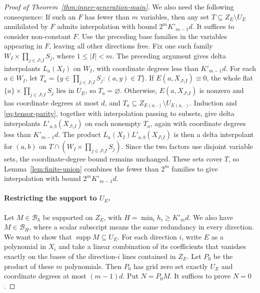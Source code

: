 \documentclass[11pt,letterpaper]{article}
\renewcommand{\le}{\leqslant}
\renewcommand{\ge}{\geqslant}
\theoremstyle{definition}
\theoremstyle{remark}
\newcommand{\supp}{\operatorname{supp}}
\begin{document}
\begin{proof}[Proof of Theorem~\ref{thm:inner-generation-main}]
We also need the following consequence: If such an $F$ has fewer than
$m$ variables, then any set
$T\subseteq Z_E\setminus U_E$ annihilated by $F$ admits interpolation
with bound $2^mK'_{m-1}d$.
It suffices to consider non-constant $F$. Use the
preceding base families in the variables appearing in $F$,
leaving all other directions free. Fix one such family
$W_I\times \prod_{j\in J \setminus I} S_j$, where $1\le|I|<m$. The preceding argument gives delta
interpolants $L_a(X_I)$ on $W_I$, with coordinate degrees
less than $K'_{m-1}d$.
For each $a\in W_I$, let
$T_a=\{y\in \prod_{j \in J\setminus I} S_j :(a,y)\in T\}$.
If $E(a,X_{J\setminus I})\equiv0$, the whole flat $\{a\}\times \prod_{j \in J\setminus I}S_{j}$
lies in $U_E$, so $T_a=\varnothing$. Otherwise, $E(a,X_{J\setminus I})$ is nonzero and has
coordinate degrees at most $d$, and $T_a\subseteq Z_{E(a,\cdot)}\setminus U_{E(a,\cdot)}.$
Induction and \eqref{eq:tensor-parity}, together with
interpolation passing to subsets, give delta interpolants
$L'_{a,b}(X_{J\setminus I})$ on each nonempty $T_a$, again with coordinate
degrees less than $K'_{m-1}d$.
The product $L_a(X_I)L'_{a,b}(X_{J\setminus I})$ is then a delta interpolant
for $(a,b)$ on $T\cap(W_I\times \prod_{j \in J\setminus I} S_j)$. Since the two factors
use disjoint variable sets, the coordinate-degree bound
remains unchanged. These sets cover $T$, so
Lemma~\ref{lem:finite-union} combines the fewer than $2^m$
families to give interpolation with bound $2^mK'_{m-1}d$.

\paragraph{Restricting the support to $U_E$.}
Let $M\in\mathcal{B}_h$ be supported on $Z_E$, with $H=\min_i h_i\ge K'_m d$. We also have $M\in\mathcal B_H$, where a scalar subscript means the same redundancy in every direction. We want to show that $\supp M\subseteq U_E$.
For each direction $i$, write $E$ as a polynomial in $X_i$ and take a
linear combination of its coefficients that vanishes exactly on the bases of
the direction-$i$ lines contained in $Z_E$. Let $P_0$ be the product of these $m$ polynomials. Then $P_0$ has grid zero set exactly $U_E$ and coordinate degrees at most $(m-1)d$. Put $N=P_0M$. It suffices to prove $N=0$.


\end{proof}
\end{document}
